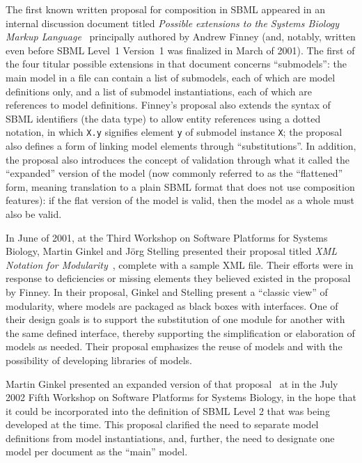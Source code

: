 The first known written proposal for composition in SBML appeared in an internal discussion document titled \emph{Possible extensions to the   Systems Biology Markup Language}~\citep{finney:2000} principally authored by Andrew Finney (and, notably, written even before SBML Level~1 Version~1 was finalized in March of 2001).  The first of the four titular possible extensions in that document concerns ``submodels'': the main model in a file can contain a list of submodels, each of which are model definitions only, and a list of submodel instantiations, each of which are references to model definitions.  Finney's proposal also extends the syntax of SBML identifiers (the  data type) to allow entity references using a dotted notation, in which \texttt{X.y} signifies element \texttt{y} of submodel instance \texttt{X}; the proposal also defines a form of linking model elements through ``substitutions''.  In addition, the proposal also introduces the concept of validation through what it called the ``expanded'' version of the model (now commonly referred to as the ``flattened'' form, meaning translation to a plain SBML format that does not use composition features): if the flat version of the model is valid, then the model as a whole must also be valid.

In June of 2001, at the Third Workshop on Software Platforms for Systems Biology, Martin Ginkel and J\"{o}rg Stelling presented their proposal titled \emph{XML Notation for Modularity}~\citep{ginkel:2001}, complete with a sample XML file.  Their efforts were in response to deficiencies or missing elements they believed existed in the proposal by Finney.  In their proposal, Ginkel and Stelling present a ``classic view'' of modularity, where models are packaged as black boxes with interfaces.  One of their design goals is to support the substitution of one module for another with the same defined interface, thereby supporting the simplification or elaboration of models as needed.  Their proposal emphasizes the reuse of models and with the possibility of developing libraries of models.

Martin Ginkel presented an expanded version of that proposal~\citep{ginkel:2002} at in the July 2002 Fifth Workshop on Software Platforms for Systems Biology, in the hope that it could be incorporated into the definition of SBML Level 2 that was being developed at the time.  This proposal clarified the need to separate model definitions from model instantiations, and, further, the need to designate one model per document as the ``main'' model.


